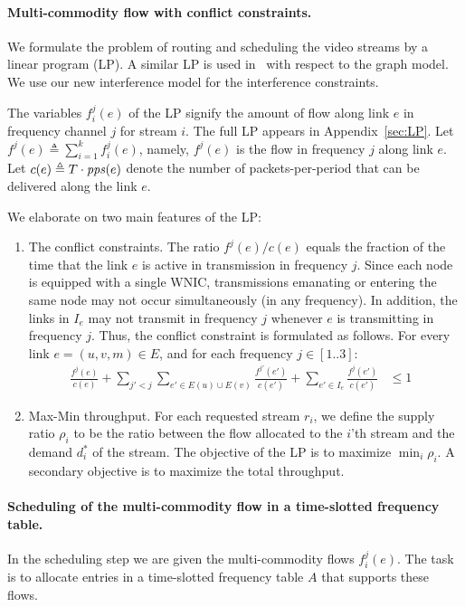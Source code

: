 \documentclass[12pt,oneside,english,a4paper]{book}
\theoremstyle{plain}
\theoremstyle{definition}
\theoremstyle{Theorem}
\theoremstyle{plain}
\newenvironment{proof sketch}[1]{\noindent {\emph{Proof sketch of #1:}}}{\hfill \qed}
\newcommand{\eqdf}{\triangleq}
\newcommand{\pps}{\text{\emph{pps}}}
\begin{document}
\paragraph{Multi-commodity flow with conflict constraints.}
We formulate the problem of routing and scheduling the video streams
by a linear program (LP).  A similar LP is used
in~\cite{kumar2005algorithmic,alicherry2005joint11,buragohain2007improved} with respect to
the graph model.  We use our new interference model
for the interference constraints.

The variables $f^j_i(e)$ of the LP signify the amount of
flow along link $e$ in frequency channel $j$ for stream $i$.
The full LP  appears in Appendix~\ref{sec:LP}.
Let $f^j(e) \eqdf\sum_{i=1}^k
  f^j_i(e)$, namely, $f^j(e)$ is the flow in frequency $j$ along link
  $e$.  Let $c(e)\eqdf T \cdot \pps(e)$ denote the number
  of packets-per-period that can be delivered along the link $e$.

\medskip
\noindent
We elaborate on two main features of the LP:
\begin{enumerate}
\item The conflict constraints.  The ratio $f^j(e)/c(e)$ equals the
  fraction of the time that the link $e$ is active in transmission in
  frequency $j$. Since each node is equipped with a single WNIC,
  transmissions emanating or entering the same node may not occur
  simultaneously (in any frequency). In addition, the links in $I_e$
  may not transmit in frequency $j$ whenever $e$ is transmitting in
  frequency $j$. Thus, the conflict constraint is formulated as follows. For
  every link $e=(u,v,m)\in E$, and for each frequency $j\in[1..3]$:
  \begin{align*}
        \frac{f^j(e)}{c(e)} + \sum_{j'< j} \sum_{e'\in E(u)\cup E(v)}
    \frac{f^{j'}(e')}{c(e')} + \sum_{e' \in I_{e}}
    \frac{f^j(e')}{c(e')} & \leq 1 &
  \end{align*}
\item Max-Min throughput.
For each requested stream $r_i$, we define the supply ratio $\rho_i$
to be the ratio between the flow allocated to the $i$'th stream and
the demand $d^*_i$ of the stream.  The objective of the LP is to
maximize $\min_i \rho_i$.  A secondary objective is to maximize the
total throughput.
\end{enumerate}

\paragraph{Scheduling of the multi-commodity flow in a time-slotted
  frequency table.}
In the scheduling step we are given the multi-commodity flows
$f^j_i(e)$.  The task is to allocate entries in a
time-slotted frequency table $A$ that supports these flows.
\end{document}
